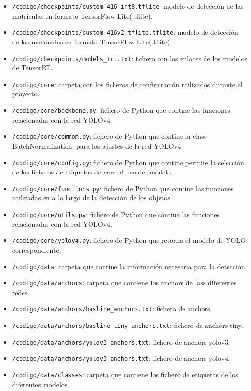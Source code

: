 \begin{itemize}
    \item \texttt{/codigo/checkpoints/custom-416-int8.tflite}: modelo de detección de las matrículas en formato TensorFlow Lite(.tflite).
    \item \texttt{/codigo/checkpoints/custom-416v2.tflite.tflite}: modelo de detección de las matrículas en formato TensorFlow Lite(.tflite)
    \item \texttt{/codigo/checkpoints/models\_trt.txt}: fichero con los enlaces de los modelos de TensorRT.
    \item \texttt{/codigo/core}: carpeta con los ficheros de configuración utilizados durante el proyecto.
    \item \texttt{/codigo/core/backbone.py}: fichero de Python que contine las funciones relacionadas con la red YOLOv4
    \item \texttt{/codigo/core/commom.py}: fichero de Python que contine la clase BatchNormalization, para los ajustes de la red YOLOv4
    \item \texttt{/codigo/core/config.py}: fichero de Python que contine permite la selección de los ficheros de etiquetas de cara al uso del modelo
    \item \texttt{/codigo/core/functions.py}: fichero de Python que contine las funciones utilizadas en a lo largo de la detección de los objetos.
    \item \texttt{/codigo/core/utils.py}: fichero de Python que contine las funciones relacionadas con la red YOLOv4.
    \item \texttt{/codigo/core/yolov4.py}: fichero de Python que retorna el modelo de YOLO correspondiente.
    \item \texttt{/codigo/data}: carpeta que contine la información necesaria para la detección.
    \item \texttt{/codigo/data/anchors}: carpeta que contiene los anchors de lass diferentes redes.
    \item \texttt{/codigo/data/anchors/basline\_anchors.txt}: fichero de anchors.
    \item \texttt{/codigo/data/anchors/basline\_tiny\_anchors.txt}: fichero de anchors tiny.
    \item \texttt{/codigo/data/anchors/yolov3\_anchors.txt}: fichero de anchors yolov3.
    \item \texttt{/codigo/data/anchors/yolov3\_anchors.txt}: fichero de anchors yolov4.
    \item \texttt{/codigo/data/classes}: carpeta que contiene los fichero de etiquetas de los diferentes modelos.

\end{itemize}
